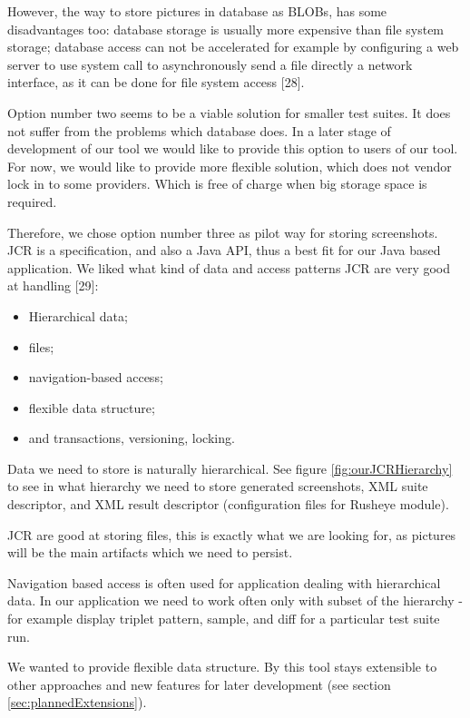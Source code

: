 \documentclass[11pt,oneside,final]{fithesis2}
\begin{document}
    However, the way to store pictures in database as BLOBs, has some disadvantages too: database storage is usually more expensive
    than file system storage; database access can not be accelerated for example by configuring a web server to use system call to
    asynchronously send a file directly a network interface, as it can be done for file system access [28].
    
    Option number two seems to be a viable solution for smaller test suites. It does not suffer from the problems which database does.
    In a later stage of development of our tool we would like to provide this option to users of our tool. For now, we would like to
    provide more flexible solution, which does not vendor lock in to some providers. Which is free of charge when big storage
    space is required.
    
    Therefore, we chose option number three as pilot way for storing screenshots. JCR is a specification, and also a Java
    API, thus a best fit for our Java based application. We liked what kind of data and access
    patterns JCR are very good at handling [29]:
    
    \begin{itemize}
     \item Hierarchical data;
     \item files;
     \item navigation-based access;
     \item flexible data structure;
     \item and transactions, versioning, locking.
    \end{itemize}
    
    Data we need to store is naturally hierarchical. See figure \ref{fig:ourJCRHierarchy} to 
    see in what hierarchy we need to store generated screenshots, XML suite descriptor, and XML result descriptor (configuration
    files for Rusheye module).
    
    JCR are good at storing files, this is exactly what we are looking for, as pictures will be the main artifacts which we need to
    persist.
    
    Navigation based access is often used for application dealing with hierarchical data. In our application we need to work often 
    only with subset of the hierarchy - for example display triplet pattern, sample, and diff for a particular test suite run.
    
    We wanted to provide flexible data structure. By this tool stays extensible to other approaches and new features for later
    development (see section \ref{sec:plannedExtensions}).
    
\end{document}

